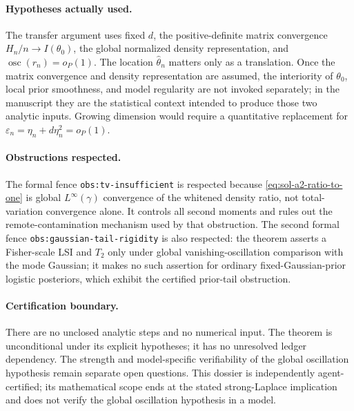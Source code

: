 \documentclass[../main.tex]{subfiles}
\begin{document}
\paragraph{Hypotheses actually used.}
The transfer argument uses fixed $d$, the positive-definite matrix convergence
$H_n/n\to I(\theta_0)$, the global normalized density representation, and
$\operatorname{osc}(r_n)=o_P(1)$.  The location $\hat\theta_n$ matters only as a translation.
Once the matrix convergence and density representation are assumed, the interiority of
$\theta_0$, local prior smoothness, and model regularity are not invoked separately; in the
manuscript they are the statistical context intended to produce those two analytic inputs.
Growing dimension would require a quantitative replacement for
$\varepsilon_n=\eta_n+d\eta_n^2=o_P(1)$.

\paragraph{Obstructions respected.}
The formal fence \texttt{obs:tv-insufficient} is respected because
\eqref{eq:sol-a2-ratio-to-one} is global $L^\infty(\gamma)$ convergence of the whitened density
ratio, not total-variation convergence alone.  It controls all second moments and rules out the
remote-contamination mechanism used by that obstruction.  The second formal fence
\texttt{obs:gaussian-tail-rigidity} is also respected: the theorem asserts a Fisher-scale LSI
and $T_2$ only under global vanishing-oscillation comparison with the mode Gaussian; it makes no
such assertion for ordinary fixed-Gaussian-prior logistic posteriors, which exhibit the certified
prior-tail obstruction.

\paragraph{Certification boundary.}
There are no unclosed analytic steps and no numerical input.  The theorem is unconditional under
its explicit hypotheses; it has no unresolved ledger dependency.  The strength and
model-specific verifiability of the global oscillation hypothesis remain separate open questions.
This dossier is independently agent-certified; its mathematical scope ends at the stated
strong-Laplace implication and does not verify the global oscillation hypothesis in a model.
\end{document}
